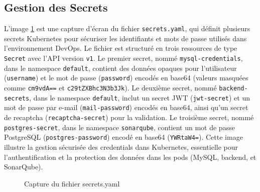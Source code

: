 \subsection{Gestion des Secrets}
L'image \ref{fig:secrkun} est une capture d’écran du fichier \texttt{secrets.yaml}, qui définit plusieurs secrets Kubernetes pour sécuriser les identifiants et mots de passe utilisés dans l’environnement DevOps. Le fichier est structuré en trois ressources de type \texttt{Secret} avec l’API version \texttt{v1}. Le premier secret, nommé \texttt{mysql-credentials}, dans le namespace \texttt{default}, contient des données opaques pour l’utilisateur (\texttt{username}) et le mot de passe (\texttt{password}) encodés en base64 (valeurs masquées comme \texttt{cm9vdA==} et \texttt{c29tZXBhc3N3b3Jk}). Le deuxième secret, nommé \texttt{backend-secrets}, dans le namespace \texttt{default}, inclut un secret JWT (\texttt{jwt-secret}) et un mot de passe par e-mail (\texttt{mail-password}) encodés en base64, ainsi qu’un secret de recaptcha (\texttt{recaptcha-secret}) pour la validation. Le troisième secret, nommé \texttt{postgres-secret}, dans le namespace \texttt{sonarqube}, contient un mot de passe PostgreSQL (\texttt{postgres-password}) encodé en base64 (\texttt{YWRtaW4=}). Cette image illustre la gestion sécurisée des credentials dans Kubernetes, essentielle pour l’authentification et la protection des données dans les pods (MySQL, backend, et SonarQube).
\newpage
\begin{figure}[h]
    \begin{adjustwidth}{-3.5cm}{-3.5cm}
    \centering
    \caption{Capture du fichier secrets.yaml}
    \label{fig:secrkun}
    \end{adjustwidth}
\end{figure}
